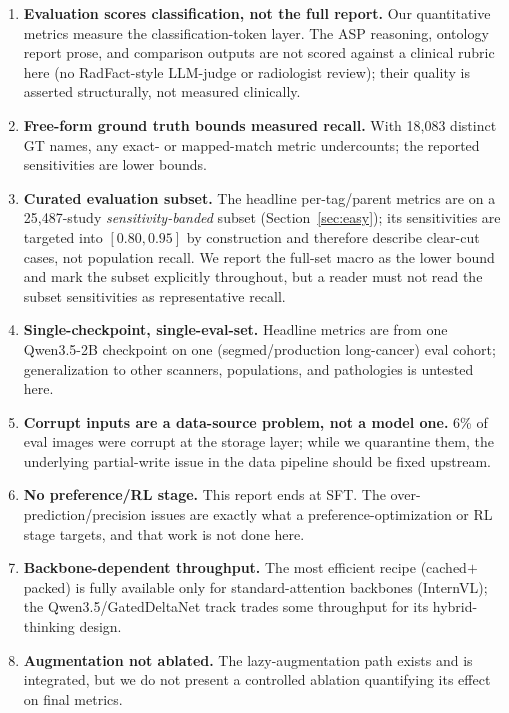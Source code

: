 \documentclass[11pt,a4paper]{article}
\begin{document}
\begin{enumerate}[leftmargin=1.6em]
  \item \textbf{Evaluation scores classification, not the full report.} Our quantitative metrics measure the classification-token layer. The ASP reasoning, ontology report prose, and comparison outputs are not scored against a clinical rubric here (no RadFact-style LLM-judge or radiologist review); their quality is asserted structurally, not measured clinically.
  \item \textbf{Free-form ground truth bounds measured recall.} With 18{,}083 distinct GT names, any exact- or mapped-match metric undercounts; the reported sensitivities are lower bounds.
  \item \textbf{Curated evaluation subset.} The headline per-tag/parent metrics are on a 25{,}487-study \emph{sensitivity-banded} subset (Section~\ref{sec:easy}); its sensitivities are targeted into $[0.80,0.95]$ by construction and therefore describe clear-cut cases, not population recall. We report the full-set macro as the lower bound and mark the subset explicitly throughout, but a reader must not read the subset sensitivities as representative recall.
  \item \textbf{Single-checkpoint, single-eval-set.} Headline metrics are from one Qwen3.5-2B checkpoint on one (segmed/production long-cancer) eval cohort; generalization to other scanners, populations, and pathologies is untested here.
  \item \textbf{Corrupt inputs are a data-source problem, not a model one.} 6\% of eval images were corrupt at the storage layer; while we quarantine them, the underlying partial-write issue in the data pipeline should be fixed upstream.
  \item \textbf{No preference/RL stage.} This report ends at SFT. The over-prediction/precision issues are exactly what a preference-optimization or RL stage targets, and that work is not done here.
  \item \textbf{Backbone-dependent throughput.} The most efficient recipe (cached$+$packed) is fully available only for standard-attention backbones (InternVL); the Qwen3.5/GatedDeltaNet track trades some throughput for its hybrid-thinking design.
  \item \textbf{Augmentation not ablated.} The lazy-augmentation path exists and is integrated, but we do not present a controlled ablation quantifying its effect on final metrics.
\end{enumerate}
\end{document}
